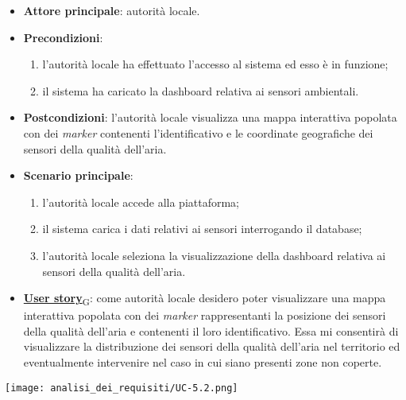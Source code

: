 \begin{itemize}
	\item \textbf{Attore principale}: autorità locale.
	\item \textbf{Precondizioni}:
	      \begin{enumerate}
		      \item l'autorità locale ha effettuato l'accesso al sistema ed esso è in funzione;
		      \item il sistema ha caricato la dashboard relativa ai sensori ambientali.
	      \end{enumerate}
	\item \textbf{Postcondizioni}: l'autorità locale visualizza una mappa interattiva popolata con dei \textit{marker} contenenti l'identificativo e le coordinate geografiche dei sensori della qualità dell'aria.
	\item \textbf{Scenario principale}:
	      \begin{enumerate}
		      \item l'autorità locale accede alla piattaforma;
		      \item il sistema carica i dati relativi ai sensori interrogando il database;
		      \item l'autorità locale seleziona la visualizzazione della dashboard relativa ai sensori della qualità dell'aria.
	      \end{enumerate}
	\item \href{https://7last.github.io/docs/rtb/documentazione-interna/glossario\#user-story}{\textbf{User story}\textsubscript{G}}:
	      come autorità locale desidero poter visualizzare una mappa interattiva popolata con dei \textit{marker} rappresentanti la posizione dei sensori della qualità dell'aria
	      e contenenti il loro identificativo. Essa mi consentirà di visualizzare la distribuzione dei sensori della qualità dell'aria nel territorio ed eventualmente intervenire nel caso in cui siano presenti zone non coperte.
\end{itemize}
\begin{center}
	\texttt{[image: analisi\_dei\_requisiti/UC-5.2.png]}
\end{center}


